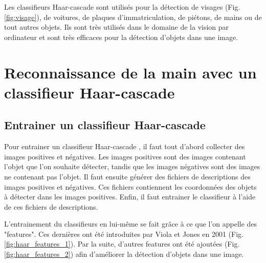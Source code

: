 \documentclass[11pt]{article}
\begin{document}
Les classifieurs Haar-cascade sont utilisés pour la détection de visages (Fig. \ref{fig:visage}), de voitures, de plaques d'immatriculation, de piétons, de mains ou de tout autres objets. Ils sont très utilisés dans le domaine de la vision par ordinateur et sont très efficaces pour la détection d'objets dans une image. 



\newpage

\section{Reconnaissance de la main avec un classifieur Haar-cascade}
\subsection{Entrainer un classifieur Haar-cascade}
Pour entrainer un classifieur Haar-cascade \cite{mittal_haar_2024}, il faut tout d'abord collecter des images positives et négatives. Les images positives sont des images contenant l'objet que l'on souhaite détecter, tandis que les images négatives sont des images ne contenant pas l'objet. Il faut ensuite générer des fichiers de descriptions des images positives et négatives. Ces fichiers contiennent les coordonnées des objets à détecter dans les images positives. Enfin, il faut entrainer le classifieur à l'aide de ces fichiers de descriptions. \bigbreak

L'entrainement du classifieurs en lui-même se fait grâce à ce que l'on appelle des "features". Ces dernières ont été introduites par Viola et Jones en 2001 (Fig. \ref{fig:haar_features_1}). Par la suite, d'autres features ont été ajoutées (Fig. \ref{fig:haar_features_2}) afin d'améliorer la détection d'objets dans une image.
\bigbreak \bigbreak
\end{document}
